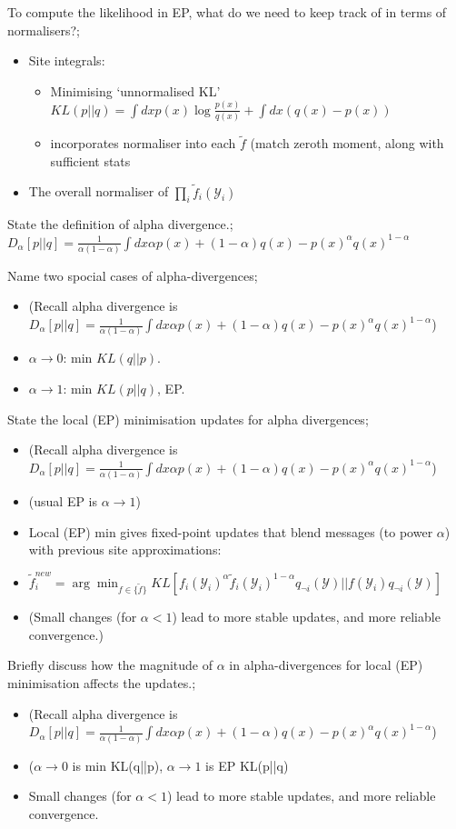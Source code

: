 \documentclass{article}
\begin{document}
To compute the likelihood in EP, what do we need to keep track of in terms of normalisers?; \begin{itemize} \item Site integrals: \begin{itemize} \item Minimising `unnormalised KL' $KL(p||q) = \int dx p(x)\log \frac{p(x)}{q(x)} + \int dx (q(x) - p(x))$ \item incorporates normaliser into each $\tilde{f}$ (match zeroth moment, along with sufficient stats \end{itemize} \item The overall normaliser of $\prod_i\tilde{f}_i(\mathcal{Y}_i)$ \end{itemize}

State the definition of alpha divergence.; $D_{\alpha}[p||q] = \frac{1}{\alpha(1-\alpha)}\int dx \alpha p(x) + (1-\alpha)q(x) - p(x)^{\alpha}q(x)^{1-\alpha}$


Name two spocial cases of alpha-divergences; \begin{itemize} \item (Recall alpha divergence is $D_{\alpha}[p||q] = \frac{1}{\alpha(1-\alpha)}\int dx \alpha p(x) + (1-\alpha)q(x) - p(x)^{\alpha}q(x)^{1-\alpha}$) \item $\alpha\rightarrow 0$: min $KL(q||p)$. \item $\alpha\rightarrow 1$: min $KL(p||q)$, EP. \end{itemize}

State the local (EP) minimisation updates for alpha divergences; \begin{itemize} \item (Recall alpha divergence is $D_{\alpha}[p||q] = \frac{1}{\alpha(1-\alpha)}\int dx \alpha p(x) + (1-\alpha)q(x) - p(x)^{\alpha}q(x)^{1-\alpha}$) \item (usual EP is $\alpha\rightarrow 1$) \item Local (EP) min gives fixed-point updates that blend messages (to power $\alpha$) with previous site approximations: \item $\tilde{f}^{new}_i = \arg\min_{f \in \{\tilde{f}\}} KL[f_i(\mathcal{Y}_i)^{\alpha}\tilde{f}_i(\mathcal{Y}_i)^{1-\alpha}q_{\neg i}(\mathcal{Y})||f(\mathcal{Y}_i)q_{\neg i}(\mathcal{Y})]$ \item (Small changes (for $\alpha < 1$) lead to more stable updates, and more reliable convergence.) \end{itemize}

Briefly discuss how the magnitude of $\alpha$ in alpha-divergences for local (EP) minimisation affects the updates.; \begin{itemize} \item (Recall alpha divergence is $D_{\alpha}[p||q] = \frac{1}{\alpha(1-\alpha)}\int dx \alpha p(x) + (1-\alpha)q(x) - p(x)^{\alpha}q(x)^{1-\alpha}$) \item ($\alpha\rightarrow 0$ is min KL(q||p), $\alpha\rightarrow 1$ is EP KL(p||q) \item Small changes (for $\alpha < 1$) lead to more stable updates, and more reliable convergence. \end{itemize}
\end{document}
